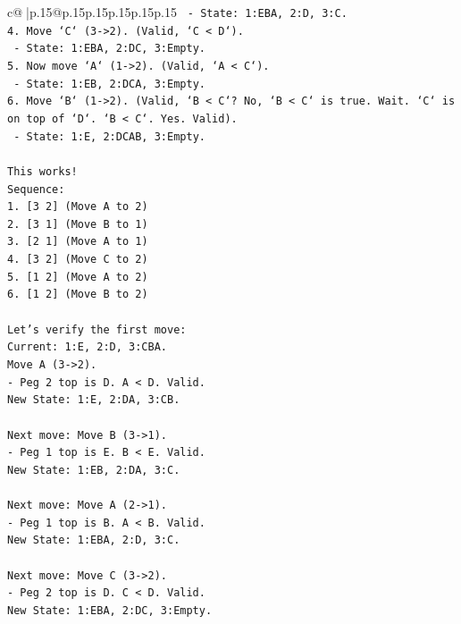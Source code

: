 \documentclass{article}
\begin{document}
{\begin{supertabular}{c@{$\;$}|p{.15\linewidth}@{}p{.15\linewidth}p{.15\linewidth}p{.15\linewidth}p{.15\linewidth}p{.15\linewidth}}
{{{\texttt{   {-} State: 1:EBA, 2:D, 3:C.} \\
\texttt{4. Move `C` (3{-}>2). (Valid, `C < D`).} \\
\texttt{   {-} State: 1:EBA, 2:DC, 3:Empty.} \\
\texttt{5. Now move `A` (1{-}>2). (Valid, `A < C`).} \\
\texttt{   {-} State: 1:EB, 2:DCA, 3:Empty.} \\
\texttt{6. Move `B` (1{-}>2). (Valid, `B < C`? No, `B < C` is true. Wait. `C` is on top of `D`. `B < C`. Yes. Valid).} \\
\texttt{   {-} State: 1:E, 2:DCAB, 3:Empty.} \\
\\ 
\texttt{This works!} \\
\texttt{Sequence:} \\
\texttt{1. {[}3 2{]} (Move A to 2)} \\
\texttt{2. {[}3 1{]} (Move B to 1)} \\
\texttt{3. {[}2 1{]} (Move A to 1)} \\
\texttt{4. {[}3 2{]} (Move C to 2)} \\
\texttt{5. {[}1 2{]} (Move A to 2)} \\
\texttt{6. {[}1 2{]} (Move B to 2)} \\
\\ 
\texttt{Let's verify the first move:} \\
\texttt{Current: 1:E, 2:D, 3:CBA.} \\
\texttt{Move A (3{-}>2).} \\
\texttt{{-} Peg 2 top is D. A < D. Valid.} \\
\texttt{New State: 1:E, 2:DA, 3:CB.} \\
\\ 
\texttt{Next move: Move B (3{-}>1).} \\
\texttt{{-} Peg 1 top is E. B < E. Valid.} \\
\texttt{New State: 1:EB, 2:DA, 3:C.} \\
\\ 
\texttt{Next move: Move A (2{-}>1).} \\
\texttt{{-} Peg 1 top is B. A < B. Valid.} \\
\texttt{New State: 1:EBA, 2:D, 3:C.} \\
\\ 
\texttt{Next move: Move C (3{-}>2).} \\
\texttt{{-} Peg 2 top is D. C < D. Valid.} \\
\texttt{New State: 1:EBA, 2:DC, 3:Empty.} \\
}}}
\end{supertabular}}
\end{document}
